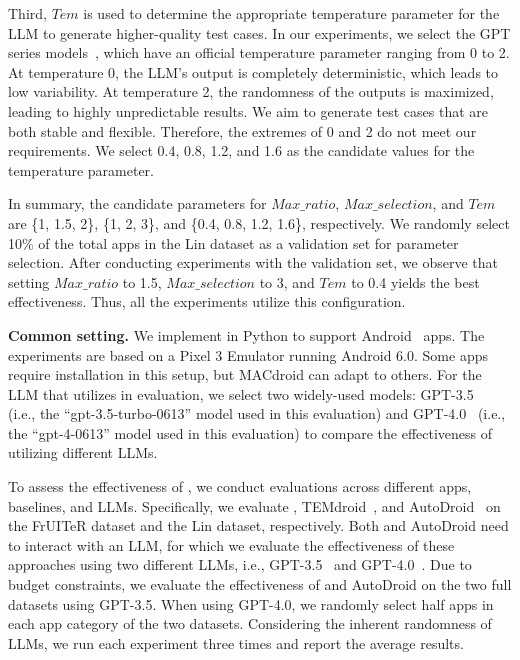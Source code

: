 Third, $Tem$ is used to determine the appropriate temperature parameter for the LLM to generate higher-quality test cases. In our experiments, we select the GPT series models~\cite{chatgpt, gpt-4}, which have an official temperature parameter ranging from 0 to 2. At temperature 0, the LLM's output is completely deterministic, which leads to low variability. At temperature 2, the randomness of the outputs is maximized, leading to highly unpredictable results. We aim to generate test cases that are both stable and flexible. Therefore, the extremes of 0 and 2 do not meet our requirements. We select 0.4, 0.8, 1.2, and 1.6 as the candidate values for the temperature parameter.


In summary, the candidate parameters for $Max\_ratio$, $Max\_selection$, and $Tem$ are \{1, 1.5, 2\}, \{1, 2, 3\}, and \{0.4, 0.8, 1.2, 1.6\}, respectively. We randomly select 10\% of the total apps in the Lin dataset as a validation set for parameter selection. After conducting experiments with the validation set, we observe that setting $Max\_ratio$ to 1.5, $Max\_selection$ to 3, and $Tem$ to 0.4 yields the best effectiveness. 
Thus, all the experiments utilize this configuration.






\textbf{Common setting.} 
We implement \toolNameSmall{} in Python to support Android~\cite{android} apps. The experiments are based on a Pixel 3 Emulator running Android 6.0. Some apps require installation in this setup, but MACdroid can adapt to others. For the LLM that \toolNameSmall{} utilizes in evaluation, we select two widely-used models: GPT-3.5~\cite{chatgpt} (i.e., the ``gpt-3.5-turbo-0613'' model used in this evaluation) and GPT-4.0~\cite{gpt-4} (i.e., the ``gpt-4-0613'' model used in this evaluation) to compare the effectiveness of utilizing different LLMs.

To assess the effectiveness of \toolNameSmall{}, we conduct evaluations across different apps, baselines, and LLMs. Specifically, we evaluate \toolNameSmall{}, TEMdroid~\cite{zhang2024learning}, and AutoDroid~\cite{wen2023empowering}  on the FrUITeR dataset and the Lin dataset, respectively. Both \toolNameSmall{} and AutoDroid need to interact with an LLM, for which we evaluate the effectiveness of these approaches using two different LLMs, i.e., GPT-3.5~\cite{chatgpt} and GPT-4.0~\cite{gpt-4}. 
Due to budget constraints, we evaluate the effectiveness of \toolNameSmall{} and AutoDroid on the two full datasets using GPT-3.5. When using GPT-4.0, we randomly select half apps in each app category of the two datasets. Considering the inherent randomness of LLMs, we run each experiment three times and report the average results.

